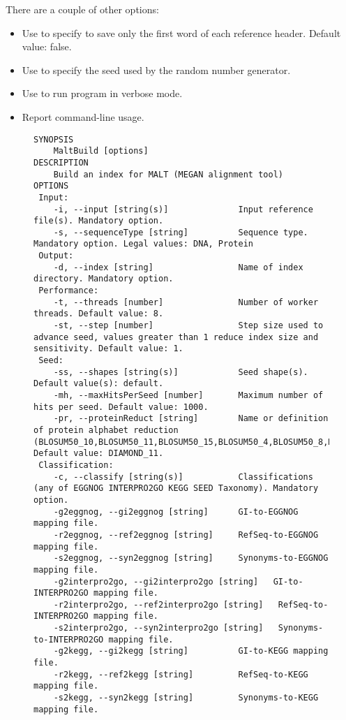\documentclass[11pt]{article}
\begin{document}
There are a couple of other options:
\begin{itemize}
\setlength{\itemindent}{30pt}
\item[\itt{--firstWordOnly}] Use to specify to save only the first word of each reference header. Default value: false.
\item[\itt{--random}] Use to specify the seed used by the random number generator.
\item[\itt{--verbose}] Use to run program in verbose mode.
\item[\itt{--help}] Report command-line usage.
\end{itemize}

\begin{figure}[h]
{\tiny
\begin{verbatim}
SYNOPSIS
	MaltBuild [options]
DESCRIPTION
	Build an index for MALT (MEGAN alignment tool)
OPTIONS
 Input:
	-i, --input [string(s)]              Input reference file(s). Mandatory option.
	-s, --sequenceType [string]          Sequence type. Mandatory option. Legal values: DNA, Protein
 Output:
	-d, --index [string]                 Name of index directory. Mandatory option.
 Performance:
	-t, --threads [number]               Number of worker threads. Default value: 8.
	-st, --step [number]                 Step size used to advance seed, values greater than 1 reduce index size and sensitivity. Default value: 1.
 Seed:
	-ss, --shapes [string(s)]            Seed shape(s). Default value(s): default.
	-mh, --maxHitsPerSeed [number]       Maximum number of hits per seed. Default value: 1000.
	-pr, --proteinReduct [string]        Name or definition of protein alphabet reduction (BLOSUM50_10,BLOSUM50_11,BLOSUM50_15,BLOSUM50_4,BLOSUM50_8,DIAMOND_11,GBMR4,HSDM17,MALT_10,SDM12,UNREDUCED). Default value: DIAMOND_11.
 Classification:
	-c, --classify [string(s)]           Classifications (any of EGGNOG INTERPRO2GO KEGG SEED Taxonomy). Mandatory option.
	-g2eggnog, --gi2eggnog [string]      GI-to-EGGNOG mapping file. 
	-r2eggnog, --ref2eggnog [string]     RefSeq-to-EGGNOG mapping file. 
	-s2eggnog, --syn2eggnog [string]     Synonyms-to-EGGNOG mapping file. 
	-g2interpro2go, --gi2interpro2go [string]   GI-to-INTERPRO2GO mapping file. 
	-r2interpro2go, --ref2interpro2go [string]   RefSeq-to-INTERPRO2GO mapping file. 
	-s2interpro2go, --syn2interpro2go [string]   Synonyms-to-INTERPRO2GO mapping file. 
	-g2kegg, --gi2kegg [string]          GI-to-KEGG mapping file. 
	-r2kegg, --ref2kegg [string]         RefSeq-to-KEGG mapping file. 
	-s2kegg, --syn2kegg [string]         Synonyms-to-KEGG mapping file. 

\end{verbatim}}
\end{figure}
\end{document}
